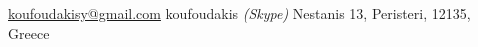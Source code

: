 \documentclass[10pt,a4paper]{article} %
\begin{document}
 



\noindent\href{mailto:koufoudakisy@gmail.com}{koufoudakisy@gmail.com}\bull %
koufoudakis \textit{(Skype)}\bull %
Nestanis 13, Peristeri, 12135, Greece %

\spacedhrule{0.9em}{-0.4em} %



\vspace{-1.3em} %
\end{document}

